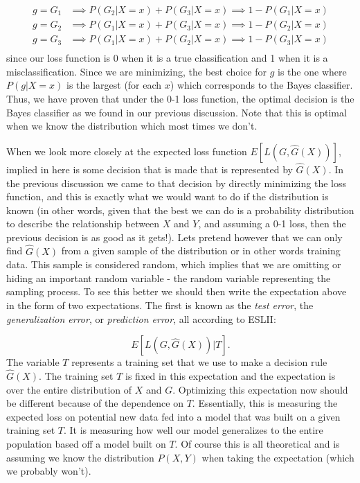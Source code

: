 \begin{equation}
\begin{split}
g=G_1 & \implies P(G_2|X=x) + P(G_3|X=x) \implies 1-P(G_1|X=x)\\
g=G_2 & \implies P(G_1|X=x) + P(G_3|X=x) \implies 1-P(G_2|X=x)\\
g=G_3 & \implies P(G_1|X=x) + P(G_2|X=x) \implies 1-P(G_3|X=x)\\
\end{split}
\end{equation}
since our loss function is 0 when it is a true classification and 1 when it is a misclassification. Since we are minimizing, the best choice for $g$ is the one where $P(g|X=x)$ is the largest (for each $x$) which corresponds to the Bayes classifier. Thus, we have proven that under the 0-1 loss function, the optimal decision is the Bayes classifier as we found in our previous discussion. Note that this is optimal when we know the distribution which most times we don't.

When we look more closely at the expected loss function $E[L(G, \hat{G}(X))]$, implied in here is some decision that is made that is represented by $\hat{G}(X)$. In the previous discussion we came to that decision by directly minimizing the loss function, and this is exactly what we would want to do if the distribution is known (in other words, given that the best we can do is a probability distribution to describe the relationship between $X$ and $Y$, and assuming a 0-1 loss, then the previous decision is as good as it gets!). Lets pretend however that we can only find $\hat{G}(X)$ from a given sample of the distribution or in other words training data. This sample is considered random, which implies that we are omitting or hiding an important random variable - the random variable representing the sampling process. To see this better we should then write the expectation above in the form of two expectations. The first is known as the \emph{test error}, the \emph{generalization error}, or \emph{prediction error}, all according to ESLII:

\begin{equation}
E[L(G, \hat{G}(X))|T].
\end{equation}
The variable $T$ represents a training set that we use to make a decision rule $\hat{G}(X)$. The training set $T$ is fixed in this expectation and the expectation is over the entire distribution of $X$ and $G$. Optimizing this expectation now should be different because of the dependence on $T$. Essentially, this is measuring the expected loss on potential new data fed into a model that was built on a given training set $T$. It is measuring how well our model generalizes to the entire population based off a model built on $T$. Of course this is all theoretical and is assuming we know the distribution $P(X,Y)$ when taking the expectation (which we probably won't).

